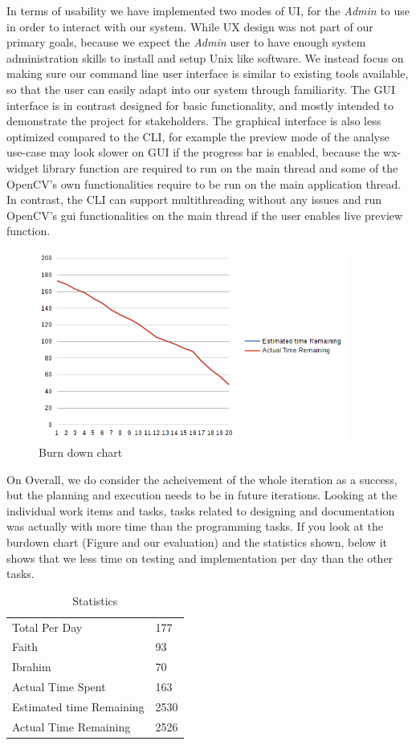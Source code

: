 \documentclass[12pt,a4paper,man]{report}
\begin{document}
In terms of usability we have implemented two modes of UI, for the \emph{Admin} to use in order to interact with our system. While UX design was not part of our primary goals, because we expect the \emph{Admin} user to have enough system administration skills to install and setup Unix like software. We instead focus on making sure our command line user interface is similar to existing tools available, so that the user can easily adapt into our system through familiarity. The GUI interface is in contrast designed for basic functionality, and mostly intended to demonstrate the project for stakeholders. The graphical interface is also less optimized compared to the CLI, for example the preview mode of the analyse use-case may look slower on GUI if the progress bar is enabled, because the wx-widget library function are required to run on the main thread and some of the OpenCV's own functionalities require to be run on the main application thread. In contrast, the CLI can support multithreading without any issues and run OpenCV's gui functionalities on the main thread if the user enables live preview function.

\begin{figure}[htbp]
\centering
\includegraphics[width=4in]{./ext_img/burndown.png}
\caption{\label{fig:bd_chart}
Burn down chart}
\end{figure}

On Overall, we do consider the acheivement of the whole iteration as a success, but the planning and execution needs to be in future iterations. Looking at the individual work items and tasks, tasks related to designing and documentation was actually with more time than the programming tasks. If you look at the burdown chart (Figure  and our evaluation) and the statistics shown, below it shows that we less time on testing and implementation per day than the other tasks.

\begin{table}[htbp]
\caption{\label{table:bdstat_table}
Statistics}
\centering
\begin{tabular}{|l|l|}
\hline
Total Per Day & 177\\
Faith & 93\\
Ibrahim & 70\\
Actual Time Spent & 163\\
Estimated time Remaining & 2530\\
Actual Time Remaining & 2526\\
\hline
\end{tabular}
\end{table}
\end{document}
